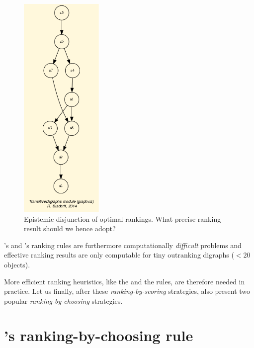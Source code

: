 \begin{figure}[h]
\sidecaption[t]
\includegraphics[width=4cm]{Figures/tutorialSlater.png}
\caption{Epistemic disjunction of optimal \Slater rankings. What precise \Slater ranking result should we hence adopt?}
\label{fig:8.4}       %
\end{figure}
       
\Kemeny 's and \Slater 's ranking rules are furthermore computationally \emph{difficult} problems and effective ranking results are only computable for tiny outranking digraphs ($< 20$ objects). 

More efficient ranking heuristics, like the \Copeland and the \NetFlows rules, are therefore needed in practice. Let us finally, after these \emph{ranking-by-scoring} strategies, also present two popular \emph{ranking-by-choosing} strategies.

\section{\Kohler 's ranking-by-choosing rule}
\label{sec:8.6}

